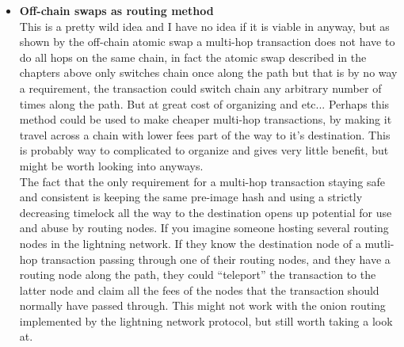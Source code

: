 \begin{itemize}
	\item \textbf{Off-chain swaps as routing method}\\This is a pretty wild idea and I have no idea if it is viable in anyway, but as shown by the off-chain atomic swap a multi-hop transaction does not have to do all hops on the same chain, in fact the atomic swap described in the chapters above only switches chain once along the path but that is by no way a requirement, the transaction could switch chain any arbitrary number of times along the path. But at great cost of organizing and etc... Perhaps this method could be used to make cheaper multi-hop transactions, by making it travel across a chain with lower fees part of the way to it's destination. This is probably way to complicated to organize and gives very little benefit, but might be worth looking into anyways.\\
	
	The fact that the only requirement for a multi-hop transaction staying safe and consistent is keeping the same pre-image hash and using a strictly decreasing timelock all the way to the destination opens up potential for use and abuse by routing nodes. If you imagine someone hosting several routing nodes in the lightning network. If they know the destination node of a mutli-hop transaction passing through one of their routing nodes, and they have a routing node along the path, they could \enquote{teleport} the transaction to the latter node and claim all the fees of the nodes that the transaction should normally have passed through. This might not work with the onion routing implemented by the lightning network protocol, but still worth taking a look at.
\end{itemize}